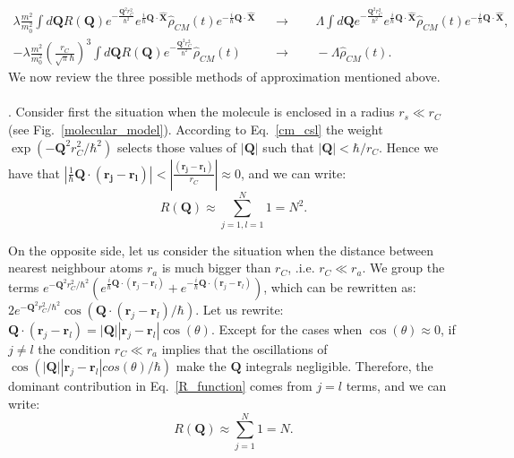 \documentclass[12pt,groupedaddress,pra,aps]{revtex4-1}
\begin{document}
\begin{align}
\lambda \frac{m^2}{m_0^2} \int d \bm{Q} R(\bm{Q}) e^{-\frac{\bm{Q}^2r_C^2}{\hbar^2}} 
e^{\frac{i}{\hbar} \bm{Q} \cdot \hat{\bm{X}}}\hat{\rho}_{CM}(t)e^{-\frac{i}{\hbar} \bm{Q} \cdot \hat{\bm{X}}}& &\xrightarrow{}& \;\;\;\;\;\Lambda  \int d \bm{Q} e^{-\frac{\bm{Q}^2r_C^2}{\hbar^2}}
e^{\frac{i}{\hbar} \bm{Q} \cdot \hat{\bm{X}}}\hat{\rho}_{CM}(t)e^{-\frac{i}{\hbar} \bm{Q} \cdot \hat{\bm{X}}},\label{withxrescaling}\\
-\lambda \frac{m^2}{m_0^2}  \left(\frac{ r_C} {\sqrt{\pi} \hbar}\right)^3  \int d \bm{Q} R(\bm{Q}) e^{-\frac{\bm{Q}^2r_C^2}{\hbar^2}}
\hat{\rho}_{CM}(t)& &\xrightarrow{}&\;\;\;\;\;-\Lambda  \hat{\rho}_{CM}(t)\label{withoutxrescaling}.
\end{align}
We now review the three possible methods of approximation mentioned above. \\ \\

.
Consider first the situation when the molecule is enclosed in a radius $r_s \ll r_C$ (see Fig.~\ref{molecular_model}). According to Eq.~\eqref{cm_csl} the weight $
 \exp(-{\bm{Q}^2r_C^2/\hbar^2})$ selects those values of $|\bm{Q}|$ such that  $|\bm{Q}| < \hbar/r_C$.  Hence we have that $|\frac{1}{\hbar} \bm{Q} \cdot (\bm{r_j}-\bm{r_l})| < |\frac{(\bm{r_j}-\bm{r_l})}{r_C}| \approx 0$, and we can write:
\begin{equation} \label{eq:dhggg}
R(\bm{Q}) \approx \sum_{j=1,l=1}^{N} 1= N^2.
\end{equation}

On the opposite side, let us consider the situation when the distance between nearest neighbour atoms $r_a$ is much bigger than $r_C$, .i.e. $r_C\ll r_a$. We group the terms $e^{-\bm{Q}^2r_C^2/\hbar^2} 
 (e^{\frac{i}{\hbar} \bm{Q} \cdot (\bm{r}_j-\bm{r}_l)}+ e^{-\frac{i}{\hbar} \bm{Q} \cdot (\bm{r}_j-\bm{r}_l)})$, which can be rewritten as:
$ 2 e^{-\bm{Q}^2r_C^2/\hbar^2} \cos(\bm{Q} \cdot (\bm{r}_j-\bm{r}_l)/\hbar)$. Let us rewrite: 
$\bm{Q} \cdot (\bm{r}_j-\bm{r}_l) =|\bm{Q}| |\bm{r}_j-\bm{r}_l| \cos(\theta)$. Except for the cases when $\cos(\theta) \approx 0$, if $j \neq l$ the condition  $r_C\ll r_a$ implies that the oscillations of $\cos(|\bm{Q}| |\bm{r}_j-\bm{r}_l| cos(\theta) /\hbar )$ make the $\bm{Q}$ integrals negligible. Therefore, the dominant contribution in Eq.~\eqref{R_function} comes from $j=l$ terms, and we can write:
\begin{equation}\label{rq_eq}
R(\bm{Q}) \approx \sum_{j=1}^{N} 1= N.
\end{equation}
 
\end{document}
